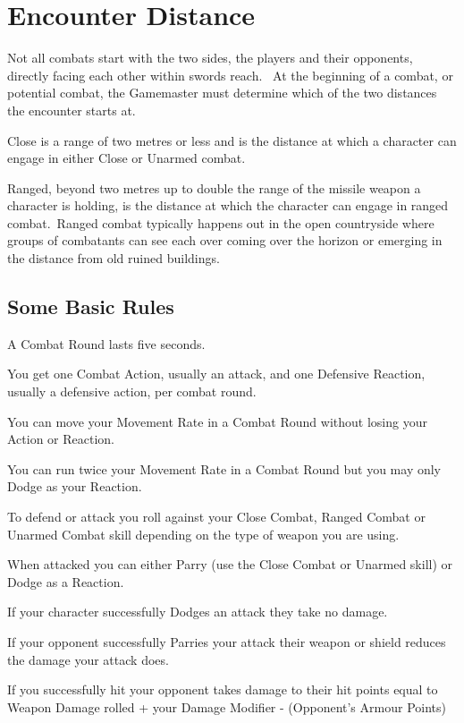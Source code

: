 \section{Encounter Distance}
Not all combats start with the two sides, the players and their opponents, directly facing each other within swords reach.  At the beginning of a combat, or potential combat, the Gamemaster must determine which of the two distances the encounter starts at.

Close is a range of two metres or less and is the distance at which a character can engage in either Close or Unarmed combat. 

Ranged, beyond two metres up to double the range of the missile weapon a character is holding, is the distance at which the character can engage in ranged combat. Ranged combat typically happens out in the open countryside where groups of combatants can see each over coming over the horizon or emerging in the distance from old ruined buildings.


\subsection{Some Basic Rules}
\begin{rpg-list}
\item A Combat Round lasts five seconds.

\item You get one Combat Action, usually an attack, and one Defensive Reaction, usually a defensive action, per combat round.

\item You can move your Movement Rate in a Combat Round without losing your Action or Reaction. 

\item You can run twice your Movement Rate in a Combat Round but you may only Dodge as your Reaction.

\item To defend or attack you roll against your Close Combat, Ranged Combat or Unarmed Combat skill depending on the type of weapon you are using.

\item When attacked you can either Parry (use the Close Combat or Unarmed skill) or Dodge as a Reaction.

\item If your character successfully Dodges an attack they take no damage.

\item If your opponent successfully Parries your attack their weapon or shield reduces the damage your attack does.

\item If you successfully hit your opponent takes damage to their hit points equal to 
	Weapon Damage rolled + your Damage Modifier - (Opponent’s Armour Points)
\end{rpg-list}


